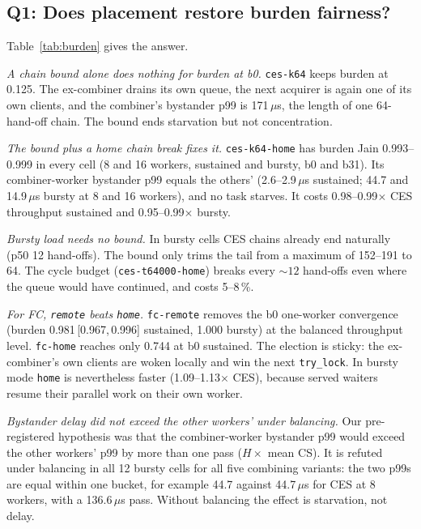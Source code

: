 \documentclass[10pt,twocolumn]{article}
\newcommand{\lk}[1]{\texttt{#1}}
\newcommand{\rng}[2]{{\scriptsize\,[#1,\,#2]}}
\begin{document}
\subsection{Q1: Does placement restore burden fairness?}\label{sec:q1}

\begin{table}[t]
\centering\footnotesize
{}
\caption{Burden fairness, phase 3, heavy $8\times$ (09-28 window). The p99
  columns are bystander delays in $\mu$s. ``/\lk{ces}'' is the throughput ratio
  to plain CES in the same cell. \lk{ces} rows with ``--'' combiner p99 have no
  bystander left on the combiner worker (evicted by balancing).}
\label{tab:burden}
\end{table}

Table~\ref{tab:burden} gives the answer.

\emph{A chain bound alone does nothing for burden at b0.}
\lk{ces-k64} keeps burden at 0.125. The ex-combiner drains its own queue, the
next acquirer is again one of its own clients, and the combiner's bystander
p99 is 171\,$\mu$s, the length of one 64-hand-off chain. The bound ends
starvation but not concentration.

\emph{The bound plus a home chain break fixes it.}
\lk{ces-k64-home} has burden Jain 0.993--0.999 in every cell (8 and 16
workers, sustained and bursty, b0 and b31). Its combiner-worker bystander p99
equals the others' (2.6--2.9\,$\mu$s sustained; 44.7 and 14.9\,$\mu$s bursty
at 8 and 16 workers), and no task starves. It costs 0.98--0.99$\times$ CES
throughput sustained and 0.95--0.99$\times$ bursty.

\emph{Bursty load needs no bound.} In bursty cells CES chains already end
naturally (p50 12 hand-offs). The bound only trims the tail from a maximum of
152--191 to 64. The cycle budget (\lk{ces-t64000-home}) breaks every
${\sim}12$ hand-offs even where the queue would have continued, and costs
5--8\,\%.

\emph{For FC, \lk{remote} beats \lk{home}.} \lk{fc-remote} removes the b0
one-worker convergence (burden 0.981\rng{0.967}{0.996} sustained, 1.000
bursty) at the balanced throughput level. \lk{fc-home} reaches only 0.744 at
b0 sustained. The election is sticky: the ex-combiner's own clients are woken
locally and win the next \lk{try\_lock}. In bursty mode \lk{home} is
nevertheless faster (1.09--1.13$\times$ CES), because served waiters resume
their parallel work on their own worker.

\emph{Bystander delay did not exceed the other workers' under balancing.}
Our pre-registered hypothesis was that the combiner-worker bystander p99 would
exceed the other workers' p99 by more than one pass ($H\times$ mean CS). It
is refuted under balancing in all 12 bursty cells for all five combining
variants: the two p99s are equal within one bucket, for example 44.7 against
44.7\,$\mu$s for CES at 8 workers, with a 136.6\,$\mu$s pass. Without balancing
the effect is starvation, not delay.
\end{document}
